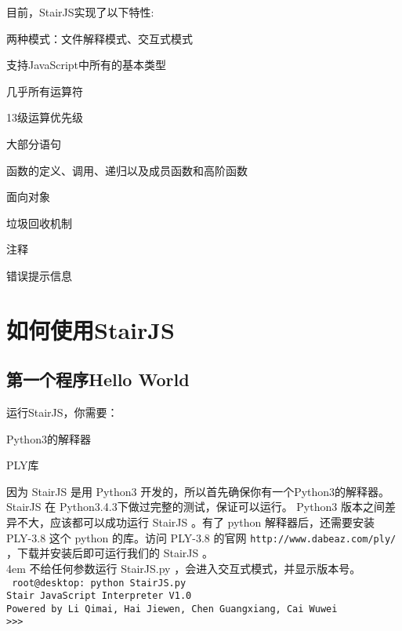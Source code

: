\documentclass[a4paper]{article}
\newcounter{rowno}
\begin{document}
\begin{CJK}{UTF8}{gbsn}
    目前，StairJS实现了以下特性:
    \setcounter{rowno}{0}
    \begin{list}{\therowno.}{\setlength{\rightmargin}{\leftmargin}}
        \item 两种模式：文件解释模式、交互式模式 
        \item 支持JavaScript中所有的基本类型 
        \item 几乎所有运算符 
        \item 13级运算优先级 
        \item 大部分语句 
        \item 函数的定义、调用、递归以及成员函数和高阶函数 
        \item 面向对象 
        \item 垃圾回收机制 
        \item 注释 
        \item 错误提示信息
    \end{list}
\section{如何使用StairJS}
    \subsection{第一个程序Hello World}
        运行StairJS，你需要：
        \setcounter{rowno}{0}
        \begin{list}{\therowno.}{\setlength{\rightmargin}{\leftmargin}}
            \item Python3的解释器
            \item PLY库
        \end{list}
        因为 StairJS 是用 Python3 开发的，所以首先确保你有一个Python3的解释器。StairJS 在 Python3.4.3下做过完整的测试，保证可以运行。 Python3 版本之间差异不大，应该都可以成功运行 StairJS 。有了 python 解释器后，还需要安装 PLY-3.8 这个 python 的库。访问 PLY-3.8 的官网 {\tt http://www.dabeaz.com/ply/} ，下载并安装后即可运行我们的 StairJS 。\\

        \hangindent 4em
        不给任何参数运行 StairJS.py ，会进入交互式模式，并显示版本号。\\
        {\tt 
            root@desktop: python StairJS.py\\
            Stair JavaScript Interpreter V1.0\\
            Powered by Li Qimai, Hai Jiewen, Chen Guangxiang, Cai Wuwei\\
            >>>\\
        }


\end{CJK}
\end{document}
